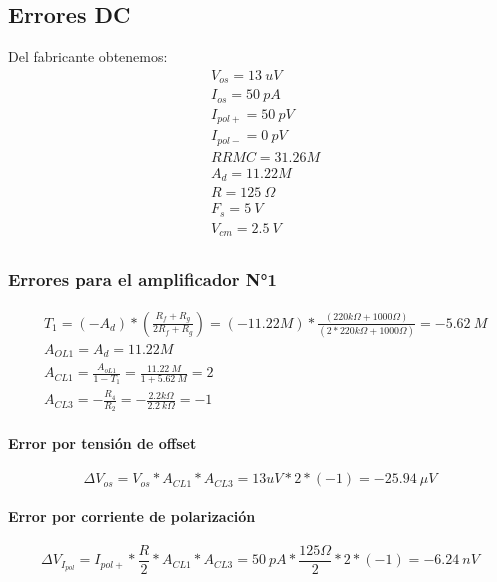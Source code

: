 \subsection{Errores DC}
Del fabricante obtenemos:
\begin{equation*}
    \begin{aligned}
        &V_{os} = 13~uV\\
        &I_{os} = 50~pA\\
        &I_{pol+} = 50~pV\\
        &I_{pol-} = 0~pV\\
        &RRMC = 31.26 M\\
        &A_d = 11.22M\\
        &R = 125~\Omega\\
        &F_s = 5~V\\
        &V_{cm} = 2.5~V\\
    \end{aligned}
\end{equation*}
\subsubsection{Errores para el amplificador N°1}
\begin{equation*}
    \begin{aligned}
        &T_1=\left(-A_d\right) *\left(\frac{R_f+R_g}{2 R_f+R_g}\right)=(-11.22 M) * \frac{(220 k \Omega+1000 \Omega)}{(2 * 220 k \Omega+1000 \Omega)}=-5.62 ~M \\
        &A_{O L 1}=A_d=11.22 M \\
        &A_{C L 1}=\frac{A_{o L 1}}{1-T_1}=\frac{11.22 ~M}{1+5.62~ M}=2 \\
        &A_{C L 3}=-\frac{R_4}{R_2}=-\frac{2.2 k \Omega}{2.2~ k \Omega}=-1
    \end{aligned}
\end{equation*}
\paragraph{Error por tensión de offset}
    \begin{equation*}
        \Delta V_{o s}=V_{o s} * A_{C L 1} * A_{C L 3}=13 u V * 2 *(-1)=-25.94 ~\mu V
    \end{equation*}
\paragraph{Error por corriente de polarización}
    \begin{equation*}
        \Delta V_{I_{p o l}}=I_{p o l+} * \frac{R}{2} * A_{C L 1} * A_{C L 3}=50~ p A * \frac{125 \Omega}{2} * 2 *(-1)=-6.24 ~n V
    \end{equation*}
